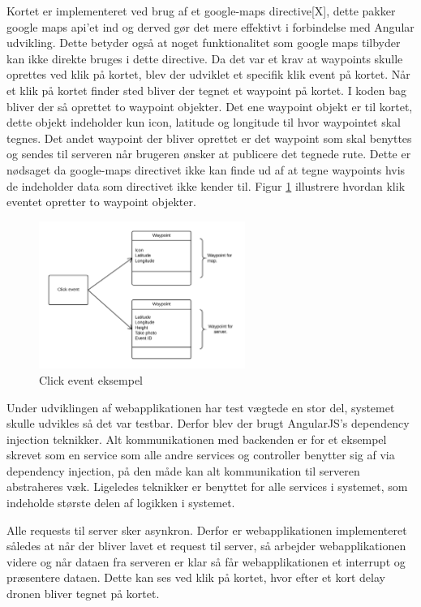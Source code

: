 Kortet er implementeret ved brug af et google-maps directive[X], dette pakker google maps api'et ind og derved gør det mere effektivt i forbindelse med Angular udvikling. Dette betyder også at noget funktionalitet som google maps tilbyder kan ikke direkte bruges i dette directive. 
Da det var et krav at waypoints skulle oprettes ved klik på kortet, blev der udviklet et specifik klik event på kortet. Når et klik på kortet finder sted bliver der tegnet et waypoint på kortet. I koden bag bliver der så oprettet to waypoint objekter. Det ene waypoint objekt er til kortet, dette objekt indeholder kun icon, latitude og longitude til hvor waypointet skal tegnes. Det andet waypoint der bliver oprettet er det waypoint som skal benyttes og sendes til serveren når brugeren ønsker at publicere det tegnede rute. Dette er nødsaget da google-maps directivet ikke kan finde ud af at tegne waypoints hvis de indeholder data som directivet ikke kender til. Figur \ref{fig:click_event} illustrere hvordan klik eventet opretter to waypoint objekter.

\vspace{-5pt}
\begin{figure}[H]
	\centering
	\includegraphics[width=0.6\textwidth]{Billeder/click_event.png}
	\vspace{-5pt}
	\caption{Click event eksempel}
	\label{fig:click_event}
\end{figure}


Under udviklingen af webapplikationen har test vægtede en stor del, systemet skulle udvikles så det var testbar. Derfor blev der brugt AngularJS's dependency injection teknikker. Alt kommunikationen med backenden er for et eksempel skrevet som en service som alle andre services og controller benytter sig af via dependency injection, på den måde kan alt kommunikation til serveren abstraheres væk. Ligeledes teknikker er benyttet for alle services i systemet, som indeholde største delen af logikken i systemet.  

Alle requests til server sker asynkron. Derfor er webapplikationen implementeret således at når der bliver lavet et request til server, så arbejder webapplikationen videre og når dataen fra serveren er klar så får webapplikationen et interrupt og præsentere dataen. Dette kan ses ved klik på kortet, hvor efter et kort delay dronen bliver tegnet på kortet.

